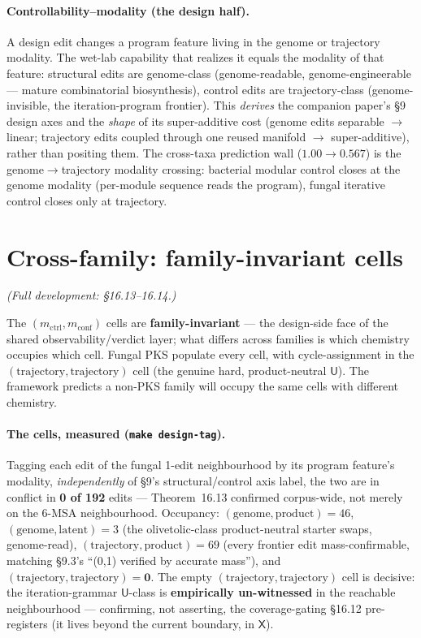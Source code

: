 \documentclass[11pt]{article}
\newcommand{\U}{\mathsf{U}}
\newcommand{\X}{\mathsf{X}}
\begin{document}
\paragraph{Controllability--modality (the design half).} A design edit changes a program feature living
in the genome or trajectory modality. The wet-lab capability that realizes it equals the modality of
that feature: structural edits are genome-class (genome-readable, genome-engineerable --- mature
combinatorial biosynthesis), control edits are trajectory-class (genome-invisible, the
iteration-program frontier). This \emph{derives} the companion paper's \S9 design axes and the
\emph{shape} of its super-additive cost (genome edits separable $\to$ linear; trajectory edits coupled
through one reused manifold $\to$ super-additive), rather than positing them. The cross-taxa prediction
wall ($1.00\to0.567$) is the genome$\to$trajectory modality crossing: bacterial modular control closes
at the genome modality (per-module sequence reads the program), fungal iterative control closes only at
trajectory.

\section{Cross-family: family-invariant cells}
\emph{(Full development: \S16.13--16.14.)}

The $(m_{\mathrm{ctrl}},m_{\mathrm{conf}})$ cells are \textbf{family-invariant} --- the design-side face
of the shared observability/verdict layer; what differs across families is which chemistry occupies
which cell. Fungal PKS populate every cell, with cycle-assignment in the
$(\text{trajectory},\text{trajectory})$ cell (the genuine hard, product-neutral $\U$). The framework
predicts a non-PKS family will occupy the same cells with different chemistry.

\paragraph{The cells, measured (\texttt{make design-tag}).} Tagging each edit of the fungal 1-edit
neighbourhood by its program feature's modality, \emph{independently} of \S9's structural/control axis
label, the two are in conflict in \textbf{0 of 192} edits --- Theorem~16.13 confirmed corpus-wide, not
merely on the 6-MSA neighbourhood. Occupancy: $(\text{genome},\text{product})=46$,
$(\text{genome},\text{latent})=3$ (the olivetolic-class product-neutral starter swaps, genome-read),
$(\text{trajectory},\text{product})=69$ (every frontier edit mass-confirmable, matching \S9.3's
``(0,1) verified by accurate mass''), and $(\text{trajectory},\text{trajectory})=\mathbf{0}$. The empty
$(\text{trajectory},\text{trajectory})$ cell is decisive: the iteration-grammar $\U$-class is
\textbf{empirically un-witnessed} in the reachable neighbourhood --- confirming, not asserting, the
coverage-gating \S16.12 pre-registers (it lives beyond the current boundary, in $\X$).
\end{document}

